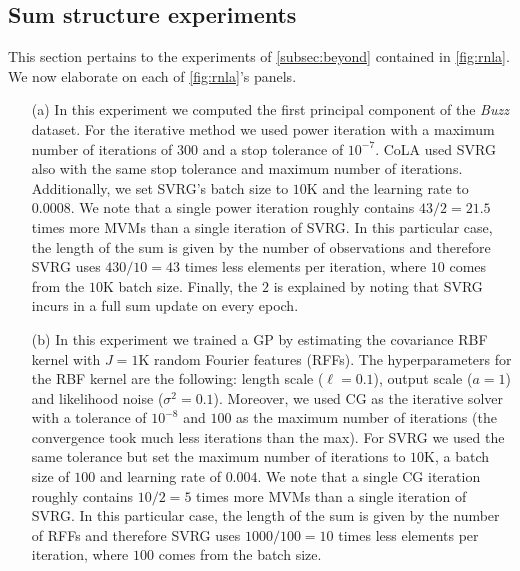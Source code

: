 \documentclass{article}
\begin{document}
\subsection{Sum structure experiments} \label{app:sum-exps}
This section pertains to the experiments of \autoref{subsec:beyond}
contained in \autoref{fig:rnla}.
We now elaborate on each of \autoref{fig:rnla}'s panels.

\begin{enumerate}
    \item[(a)]
    In this experiment we computed the first principal component of the
    \emph{Buzz} dataset.
    For the iterative method we used power iteration with a maximum number of
    iterations of $300$ and a stop tolerance of $10^{-7}$.
    CoLA used SVRG also with the same stop tolerance and maximum number of iterations.
    Additionally, we set SVRG's batch size to $10$K and the learning rate to
    $0.0008$.
    We note that a single power iteration roughly contains $43 / 2 = 21.5$ times more MVMs
    than a single iteration of SVRG.
    In this particular case, the length of the sum is given by the number of
    observations and therefore SVRG uses $430 / 10 = 43$ times less elements per iteration,
    where $10$ comes from the $10$K batch size.
    Finally, the $2$ is explained by noting that SVRG incurs in a full sum update on every epoch.

    \item[(b)]
    In this experiment we trained a GP by estimating the covariance RBF
    kernel with $J=1$K random Fourier features (RFFs).
    The hyperparameters for the RBF kernel are the following:
    length scale ($\ell=0.1$), output scale ($a=1$) and likelihood noise ($\sigma^2=0.1$).
    Moreover, we used CG as the iterative solver with a tolerance of $10^{-8}$
    and $100$ as the maximum number of iterations (the convergence took much less iterations than the max).
    For SVRG we used the same tolerance but set the maximum number of iterations to
    $10$K, a batch size of $100$ and learning rate of $0.004$.
    We note that a single CG iteration roughly contains $10 / 2 = 5$ times more MVMs
    than a single iteration of SVRG.
    In this particular case, the length of the sum is given by the number of
    RFFs and therefore SVRG uses $1000 / 100 = 10$ times less elements per iteration,
    where $100$ comes from the batch size.


\end{enumerate}
\end{document}
